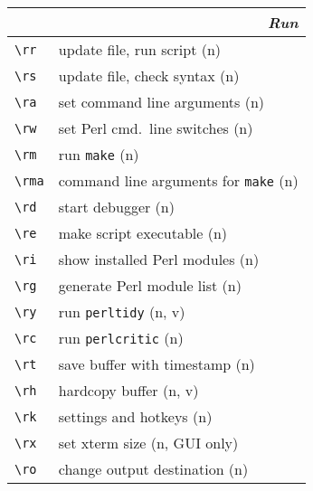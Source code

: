 \documentclass[oneside,10pt,landscape,DIV17]{scrartcl}
\begin{document}
\begin{multicols}{2}
%
\begin{tabular}[]{|p{11mm}|p{58mm}|}
\hline
\multicolumn{2}{|r|}{\textsl{\textbf{R}un}} \\[1.0ex]
\hline \verb'\rr'    & update file, run script                  \hfill (n)   \\
\hline \verb'\rs'    & update file, check syntax                \hfill (n)   \\
\hline \verb'\ra'    & set command line arguments               \hfill (n)   \\
\hline \verb'\rw'    & set Perl cmd.\ line switches             \hfill (n)   \\
\hline \verb'\rm'    & run \texttt{make}                        \hfill (n)   \\
\hline \verb'\rma'   & command line arguments for \texttt{make} \hfill (n)   \\
\hline \verb'\rd'    & start debugger                           \hfill (n)   \\
\hline \verb'\re'    & make script executable                   \hfill (n)   \\
\hline \verb'\ri'    & show installed Perl modules              \hfill (n)   \\
\hline \verb'\rg'    & generate Perl module list                \hfill (n)   \\
\hline \verb'\ry'    & run \verb'perltidy'                      \hfill (n, v)\\
\hline \verb'\rc'    & run \verb'perlcritic'                    \hfill (n)   \\
\hline \verb'\rt'    & save buffer with timestamp               \hfill (n)   \\
\hline \verb'\rh'    & hardcopy buffer                          \hfill (n, v)\\
\hline \verb'\rk'    & settings and hotkeys                     \hfill (n)   \\
\hline \verb'\rx'    & set xterm size                           \hfill (n, {\tiny GUI only})\\
\hline \verb'\ro'    & change output destination                \hfill (n)   \\
\hline
\end{tabular}%
%


\end{multicols}
\end{document}
